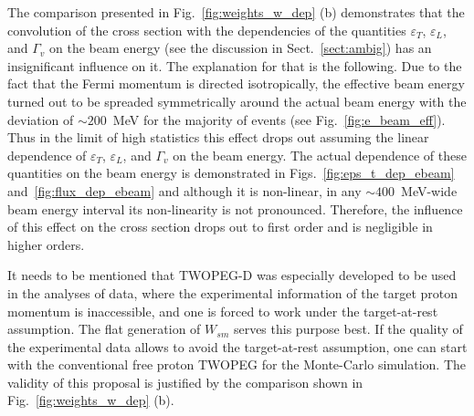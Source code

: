 The comparison presented in Fig.~\ref{fig:weights_w_dep} (b) demonstrates that the convolution of the cross section with the dependencies of the quantities $\varepsilon_{T}$, $\varepsilon_{L}$, and $\Gamma_{v}$ on the beam energy (see the discussion in Sect.~\ref{sect:ambig}) has an insignificant influence on it. The explanation for that is the following. Due to the fact that the Fermi momentum is directed isotropically, the effective beam energy turned out to be spreaded symmetrically around the actual beam energy with the deviation of $\sim 200$~MeV for the majority of events (see Fig.~\ref{fig:e_beam_eff}). Thus in the limit of high statistics this effect drops out assuming the linear dependence of $\varepsilon_{T}$, $\varepsilon_{L}$, and $\Gamma_{v}$ on the beam energy. The actual dependence of these quantities on the beam energy is demonstrated in Figs.~\ref{fig:eps_t_dep_ebeam} and~\ref{fig:flux_dep_ebeam} and although it is non-linear, in any $\sim 400$~MeV-wide beam energy interval its non-linearity is not pronounced. Therefore, the influence of this effect on the cross section drops out to first order and is negligible in higher orders. 



It needs to be mentioned that TWOPEG-D was especially developed to be used in the analyses of data, where the experimental information of the target proton momentum is inaccessible, and one is forced to work under the target-at-rest assumption. The flat generation of $W_{sm}$ serves this purpose best. If the quality of the experimental data allows to avoid the target-at-rest assumption, one can start with the conventional free proton TWOPEG for the Monte-Carlo simulation. The validity of this proposal is justified by the comparison shown in Fig.~\ref{fig:weights_w_dep} (b).










